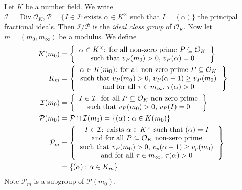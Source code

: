 \documentclass[a4paper]{article}
\DeclareMathOperator{\Div}{Div}
\renewcommand*{\O}{\mathcal{O}}
\begin{document}
Let \(K\) be a number field. We write \(\mathcal I = \Div \O_K, \mathcal P = \{I \in \mathcal I: \text{exists } \alpha \in K^\times \text{ such that } I = (\alpha)\}\) the principal fractional ideals. Then \(\mathcal I/\mathcal P\) is the \emph{ideal class group} of \(\O_K\). Now let \(m = (m_0, m_\infty)\) be a modulus. We define
\begin{align*}
  K(m_0) &= \left\{
           \begin{tabular}{c}
             \(\alpha \in K^\times\): for all non-zero prime \(P \subseteq \O_K\) \\
             such that \(v_P(m_0) > 0\), \(v_P(\alpha) = 0\)
           \end{tabular}
  \right\} \\
  K_m &= \left\{
        \begin{tabular}{c}
          \(\alpha \in K(m_0)\): for all non-zero prime \(P \subseteq \O_K\) \\
          such that \(v_P(m_0) > 0\), \(v_P(\alpha - 1) \geq v_P(m_0)\) \\
          and for all \(\tau \in m_\infty\), \(\tau(\alpha) > 0\)
        \end{tabular}
  \right\} \\
  \mathcal I(m_0) &= \left\{
                    \begin{tabular}{c}
                      \(I \in \mathcal I\): for all \(P \subseteq \O_K\) non-zero prime \\
                      such that \(v_P(m_0) > 0 \), \(v_P(I) = 0\)
                    \end{tabular}
  \right\} \\
  \mathcal P(m_0) &= \mathcal P \cap \mathcal I(m_0) = \{(\alpha): \alpha \in K(m_0)\} \\
  \mathcal P_m &=
                 \left\{
                 \begin{tabular}{c}
                   \(I \in \mathcal I\): exists \(\alpha \in K^\times\) such that \((\alpha) = I\) \\
                   and for all \(P \subseteq \O_K\) non-zero prime \\
                   such that \(v_P(m_0) > 0\), \(v_p(\alpha - 1) \geq v_p(m_0)\) \\
                   and for all \(\tau \in m_\infty\), \(\tau(\alpha) > 0\)
                 \end{tabular}
  \right\} \\
                  &= \{(\alpha): \alpha \in K_m\}
\end{align*}
Note \(\mathcal P_m\) is a subgroup of \(\mathcal P(m_0)\).
\end{document}
